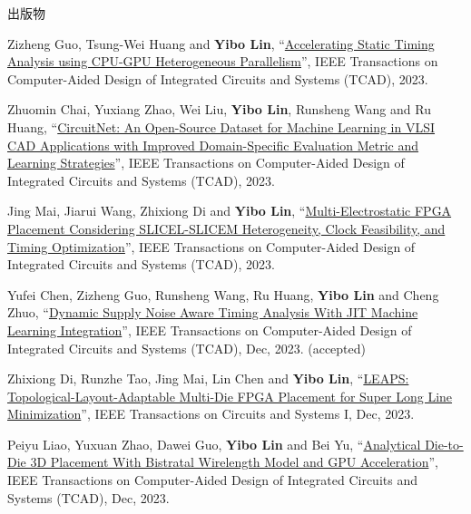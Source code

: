 \begin{rSection}{出版物}
\begin{description}[font=\normalfont, rightmargin=2em]
{}
            

\item[{[J47]}]{
        Zizheng Guo, Tsung-Wei Huang and \textbf{Yibo Lin}, 
    ``\href{https://doi.org/10.1109/TCAD.2023.3286261}{Accelerating Static Timing Analysis using CPU-GPU Heterogeneous Parallelism}'', 
    IEEE Transactions on Computer-Aided Design of Integrated Circuits and Systems (TCAD), 2023.
    
}
            

\item[{[J46]}]{
        Zhuomin Chai, Yuxiang Zhao, Wei Liu, \textbf{Yibo Lin}, Runsheng Wang and Ru Huang, 
    ``\href{https://doi.org/10.1109/TCAD.2023.3287970}{CircuitNet: An Open-Source Dataset for Machine Learning in VLSI CAD Applications with Improved Domain-Specific Evaluation Metric and Learning Strategies}'', 
    IEEE Transactions on Computer-Aided Design of Integrated Circuits and Systems (TCAD), 2023.
    
}
            

\item[{[J45]}]{
        Jing Mai, Jiarui Wang, Zhixiong Di and \textbf{Yibo Lin}, 
    ``\href{https://doi.org/10.1109/TCAD.2023.3313101}{Multi-Electrostatic FPGA Placement Considering SLICEL-SLICEM Heterogeneity, Clock Feasibility, and Timing Optimization}'', 
    IEEE Transactions on Computer-Aided Design of Integrated Circuits and Systems (TCAD), 2023.
    
}
            

\item[{[J44]}]{
        Yufei Chen, Zizheng Guo, Runsheng Wang, Ru Huang, \textbf{Yibo Lin} and Cheng Zhuo, 
    ``\href{https://doi.org/10.1109/TCAD.2023.3342603}{Dynamic Supply Noise Aware Timing Analysis With JIT Machine Learning Integration}'', 
    IEEE Transactions on Computer-Aided Design of Integrated Circuits and Systems (TCAD), Dec, 2023.
    (accepted)
}
            

\item[{[J43]}]{
        Zhixiong Di, Runzhe Tao, Jing Mai, Lin Chen and \textbf{Yibo Lin}, 
    ``\href{https://doi.org/10.1109/TCSI.2023.3340554}{LEAPS: Topological-Layout-Adaptable Multi-Die FPGA Placement for Super Long Line Minimization}'', 
    IEEE Transactions on Circuits and Systems I, Dec, 2023.
    
}
            

\item[{[J42]}]{
        Peiyu Liao, Yuxuan Zhao, Dawei Guo, \textbf{Yibo Lin} and Bei Yu, 
    ``\href{https://doi.org/10.1109/TCAD.2023.3347293}{Analytical Die-to-Die 3D Placement With Bistratal Wirelength Model and GPU Acceleration}'', 
    IEEE Transactions on Computer-Aided Design of Integrated Circuits and Systems (TCAD), Dec, 2023.
    
}
\end{description}
\end{rSection}
